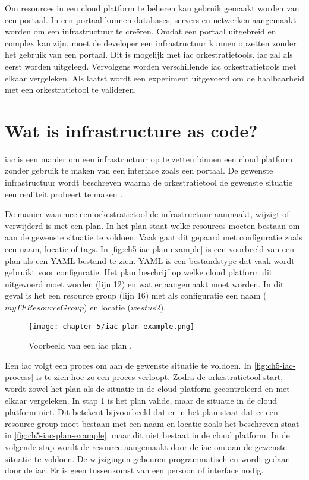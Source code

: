 Om resources in een cloud platform te beheren kan gebruik gemaakt worden van een portaal. In een portaal kunnen databases, servers en netwerken aangemaakt worden om een infrastructuur te creëren. Omdat een portaal uitgebreid en complex kan zijn, moet de developer een infrastructuur kunnen opzetten zonder het gebruik van een portaal. Dit is mogelijk met \acrfull{iac} orkestratietools. \Acrshort{iac} zal als eerst worden uitgelegd. Vervolgens worden verschillende \Acrshort{iac} orkestratietools met elkaar vergeleken. Als laatst wordt een experiment uitgevoerd om de haalbaarheid met een orkestratietool te valideren.

\section{Wat is infrastructure as code?}\label{subsec:ch5-wat-is-infrastructure-as-code}
\acrshort{iac} is een manier om een infrastructuur op te zetten binnen een cloud platform zonder gebruik te maken van een interface zoals een portaal. De gewenste infrastructuur wordt beschreven waarna de orkestratietool de gewenste situatie een realiteit probeert te maken \cite{iac-amazon-web-services-in-action}.

De manier waarmee een orkestratietool de infrastructuur aanmaakt, wijzigt of verwijderd is met een plan. In het plan staat welke resources moeten bestaan om aan de gewenste situatie te voldoen. Vaak gaat dit gepaard met configuratie zoals een naam, locatie of tags. In \autoref{fig:ch5-iac-plan-example} is een voorbeeld van een plan als een YAML bestand te zien. YAML is een bestandstype dat vaak wordt gebruikt voor configuratie. Het plan beschrijf op welke cloud platform dit uitgevoerd moet worden (lijn 12) en wat er aangemaakt moet worden. In dit geval is het een resource group (lijn 16) met als configuratie een naam (\(myTFResourceGroup\)) en locatie (\(westus2\)).

\begin{figure}[hbt!]
  \centering
  \texttt{[image: chapter-5/iac-plan-example.png]}
  \caption{Voorbeeld van een \acrfull{iac} plan \cite{terraform-plan-example}.}
  \label{fig:ch5-iac-plan-example}
\end{figure}

Een \Acrshort{iac} volgt een proces om aan de gewenste situatie te voldoen. In \autoref{fig:ch5-iac-process} is te zien hoe zo een proces verloopt. Zodra de orkestratietool start, wordt zowel het plan als de situatie in de cloud platform gecontroleerd en met elkaar vergeleken. In stap 1 is het plan valide, maar de situatie in de cloud platform niet. Dit betekent bijvoorbeeld dat er in het plan staat dat er een resource group moet bestaan met een naam en locatie zoals het beschreven staat in \autoref{fig:ch5-iac-plan-example}, maar dit niet bestaat in de cloud platform. In de volgende stap wordt de resource aangemaakt door de \Acrshort{iac} om aan de gewenste situatie te voldoen. De wijzigingen gebeuren programmatisch en wordt gedaan door de \Acrshort{iac}. Er is geen tussenkomst van een persoon of interface nodig. 

